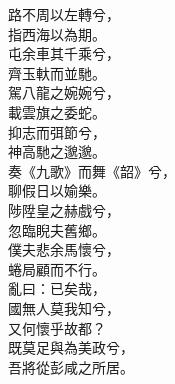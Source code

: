 \begin{pinyinscope}
\begin{shici}
路不周以左轉兮，\\
指西海以為期。\\
屯余車其千乘兮，\\
齊玉軑而並馳。\\
駕八龍之婉婉兮，\\
載雲旗之委蛇。\\
抑志而弭節兮，\\
神高馳之邈邈。\\
奏《九歌》而舞《韶》兮，\\
聊假日以媮樂。\\
陟陞皇之赫戲兮，\\
忽臨睨夫舊鄉。\\
僕夫悲余馬懷兮，\\
蜷局顧而不行。\\
亂曰：已矣哉，\\
國無人莫我知兮，\\
又何懷乎故都？\\
既莫足與為美政兮，\\
吾將從彭咸之所居。\\

\end{shici}

\end{pinyinscope}